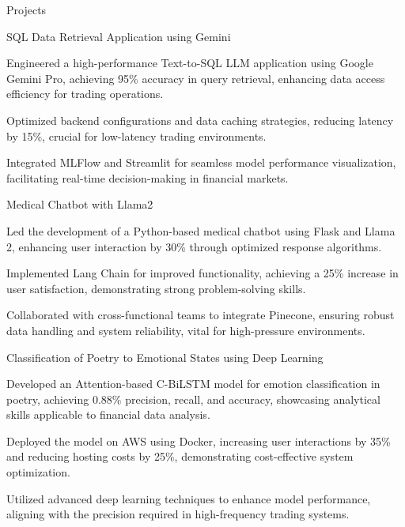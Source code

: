\documentclass{resume} %
\begin{document}
    \begin{rSection}{Projects}
                    \begin{rSubsection}
                                    {SQL Data Retrieval Application using Gemini}
                                {}{}{}
                                    \item Engineered a high{-}performance Text{-}to{-}SQL LLM application using Google Gemini Pro, achieving 95\% accuracy in query retrieval, enhancing data access efficiency for trading operations.
                                    \item Optimized backend configurations and data caching strategies, reducing latency by 15\%, crucial for low{-}latency trading environments.
                                    \item Integrated MLFlow and Streamlit for seamless model performance visualization, facilitating real{-}time decision{-}making in financial markets.
                            \end{rSubsection}
                    \begin{rSubsection}
                                    {Medical Chatbot with Llama2}
                                {}{}{}
                                    \item Led the development of a Python{-}based medical chatbot using Flask and Llama 2, enhancing user interaction by 30\% through optimized response algorithms.
                                    \item Implemented Lang Chain for improved functionality, achieving a 25\% increase in user satisfaction, demonstrating strong problem{-}solving skills.
                                    \item Collaborated with cross{-}functional teams to integrate Pinecone, ensuring robust data handling and system reliability, vital for high{-}pressure environments.
                            \end{rSubsection}
                    \begin{rSubsection}
                                    {Classification of Poetry to Emotional States using Deep Learning}
                                {}{}{}
                                    \item Developed an Attention{-}based C{-}BiLSTM model for emotion classification in poetry, achieving 0.88\% precision, recall, and accuracy, showcasing analytical skills applicable to financial data analysis.
                                    \item Deployed the model on AWS using Docker, increasing user interactions by 35\% and reducing hosting costs by 25\%, demonstrating cost{-}effective system optimization.
                                    \item Utilized advanced deep learning techniques to enhance model performance, aligning with the precision required in high{-}frequency trading systems.
                            \end{rSubsection}
            \end{rSection}
\end{document}
